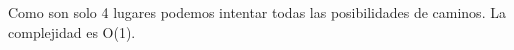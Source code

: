 
Como son solo 4 lugares podemos intentar todas las posibilidades de caminos. La complejidad es O(1).

